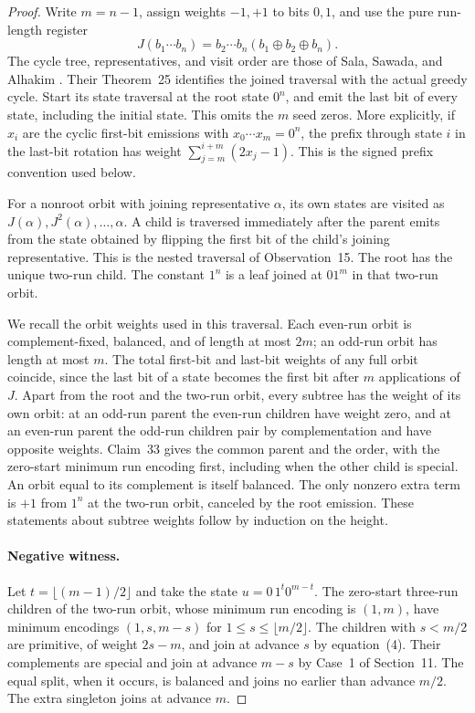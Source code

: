 \documentclass[11pt]{article}
\begin{document}
\begin{proof}
Write \(m=n-1\), assign weights \(-1,+1\) to bits \(0,1\), and use the pure run-length register
\[
  J(b_1\cdots b_n)=b_2\cdots b_n(b_1\oplus b_2\oplus b_n).
\]
The cycle tree, representatives, and visit order are those of Sala, Sawada, and Alhakim \cite[Sections~5, 7, and 11]{SalaSawadaAlhakim}. Their Theorem~25 identifies the joined traversal with the actual greedy cycle. Start its state traversal at the root state \(0^n\), and emit the last bit of every state, including the initial state. This omits the \(m\) seed zeros. More explicitly, if \(x_i\) are the cyclic first-bit emissions with \(x_0\cdots x_m=0^n\), the prefix through state \(i\) in the last-bit rotation has weight \(\sum_{j=m}^{i+m}(2x_j-1)\). This is the signed prefix convention used below.

For a nonroot orbit with joining representative \(\alpha\), its own states are visited as \(J(\alpha),J^2(\alpha),\ldots,\alpha\). A child is traversed immediately after the parent emits from the state obtained by flipping the first bit of the child's joining representative. This is the nested traversal of Observation~15. The root has the unique two-run child. The constant \(1^n\) is a leaf joined at \(01^m\) in that two-run orbit.

We recall the orbit weights used in this traversal. Each even-run orbit is complement-fixed, balanced, and of length at most \(2m\); an odd-run orbit has length at most \(m\). The total first-bit and last-bit weights of any full orbit coincide, since the last bit of a state becomes the first bit after \(m\) applications of \(J\). Apart from the root and the two-run orbit, every subtree has the weight of its own orbit: at an odd-run parent the even-run children have weight zero, and at an even-run parent the odd-run children pair by complementation and have opposite weights. Claim~33 gives the common parent and the order, with the zero-start minimum run encoding first, including when the other child is special. An orbit equal to its complement is itself balanced. The only nonzero extra term is \(+1\) from \(1^n\) at the two-run orbit, canceled by the root emission. These statements about subtree weights follow by induction on the height.

\paragraph{Negative witness.}
Let \(t=\lfloor(m-1)/2\rfloor\) and take the state \(u=0\,1^t0^{m-t}\).
The zero-start three-run children of the two-run orbit, whose minimum run encoding is \((1,m)\), have minimum encodings \((1,s,m-s)\) for \(1\le s\le\lfloor m/2\rfloor\). The children with \(s<m/2\) are primitive, of weight \(2s-m\), and join at advance \(s\) by equation~(4). Their complements are special and join at advance \(m-s\) by Case~1 of Section~11. The equal split, when it occurs, is balanced and joins no earlier than advance \(m/2\). The extra singleton joins at advance \(m\).


\end{proof}
\end{document}

